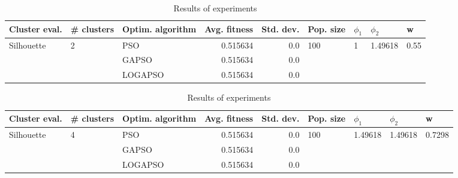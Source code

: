 \documentclass{article}
\begin{document}
\begin{table}
\centering
\caption{Results of experiments}
\begin{tabular}{lllrrllll}
\toprule
              Cluster eval. &        \# clusters & Optim. algorithm &  Avg. fitness &  Std. dev. &            Pop. size &         $\phi_{1}$ &               $\phi_{2}$ &                     w \\
\midrule
\multirow{3}{*}{Silhouette} & \multirow{3}{*}{2} &              PSO &      0.515634 &        0.0 & \multirow{3}{*}{100} & \multirow{3}{*}{1} & \multirow{3}{*}{1.49618} & \multirow{3}{*}{0.55} \\
                            &                    &            GAPSO &      0.515634 &        0.0 &                      &                    &                          &                       \\
                            &                    &          LOGAPSO &      0.515634 &        0.0 &                      &                    &                          &                       \\
\bottomrule
\end{tabular}
\end{table}
\begin{table}
\centering
\caption{Results of experiments}
\begin{tabular}{lllrrllll}
\toprule
              Cluster eval. &        \# clusters & Optim. algorithm &  Avg. fitness &  Std. dev. &            Pop. size &               $\phi_{1}$ &               $\phi_{2}$ &                       w \\
\midrule
\multirow{3}{*}{Silhouette} & \multirow{3}{*}{4} &              PSO &      0.515634 &        0.0 & \multirow{3}{*}{100} & \multirow{3}{*}{1.49618} & \multirow{3}{*}{1.49618} & \multirow{3}{*}{0.7298} \\
                            &                    &            GAPSO &      0.515634 &        0.0 &                      &                          &                          &                         \\
                            &                    &          LOGAPSO &      0.515634 &        0.0 &                      &                          &                          &                         \\
\bottomrule
\end{tabular}
\end{table}
\end{document}

